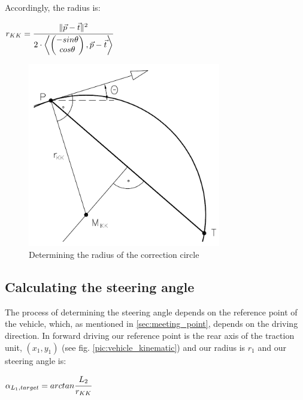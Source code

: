 Accordingly, the radius is:

\begin{center}
$ r_{KK}=
\cfrac{\| \vec{p} - \vec{t} \|^2}{2 \cdot \left \langle 
	\begin{pmatrix}
		-sin \theta \\
		cos \theta
	\end{pmatrix}
	, \vec{p} - \vec{t}
	\right \rangle
	}$
\end{center}

\begin{figure}[h]
\centering
\includegraphics[width=0.75\textwidth]{./Chapters/Figures/correction_circle_radius.png}
\caption{Determining the radius of the correction circle \cite{12} \label{pic:correction_circle_radius}}
\end{figure}

\subsection{Calculating the steering angle}
\label{sec:calculating_steering_angle}

The process of determining the steering angle depends on the reference point of the vehicle, which, as mentioned in \ref{sec:meeting_point}, depends on the driving direction. In forward driving our reference point is the rear axis of the traction unit, $(x_1,y_1)$ (see fig. \ref{pic:vehicle_kinematic}) and our radius is $r_1$ and our steering angle is:

\begin{center}
$ \alpha_{L_1,target} = arctan \cfrac{L_2}{r_{KK}} $
\end{center}

